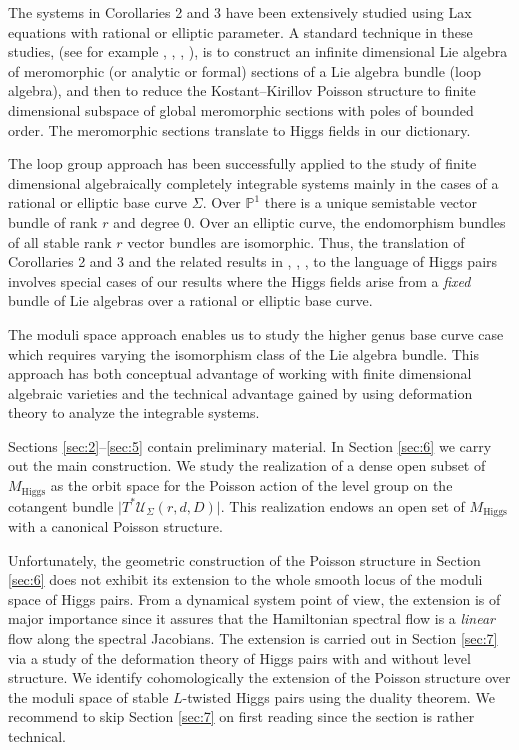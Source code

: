 \documentclass[12pt,a4paper,oneside,english]{smfart}
\theoremstyle{definition}
\theoremstyle{remark}
\newcommand{\Hig}{\mathrm{Higgs}}
\newcommand{\MH}{M_{\Hig}}
\newcommand{\cU}{\mathcal{U}}
\newcommand{\tot}[1]{\lvert #1 \rvert}
\begin{document}
The systems in Corollaries 2 and 3 have been extensively studied using Lax equations with rational or elliptic parameter. A standard technique in these studies, (see for example \cite{R-S}, \cite{A-vM}, \cite{A-H-H}, \cite{A-H-P}), is to construct an infinite dimensional Lie algebra of meromorphic (or analytic or formal) sections of a Lie algebra bundle (loop algebra), and then to reduce the Kostant--Kirillov Poisson structure to finite dimensional subspace of global meromorphic sections with poles of bounded order. The meromorphic sections translate to Higgs fields in our dictionary.

The loop group approach has been successfully applied to the study of finite dimensional algebraically completely integrable systems mainly in the cases of a rational or elliptic base curve $\Sigma$. Over $\mathbb{P}^1$ there is a unique semistable vector bundle of rank $r$ and degree $0$. Over an elliptic curve, the endomorphism bundles of all stable rank $r$ vector bundles are isomorphic. Thus, the translation of Corollaries 2 and 3 and the related results in \cite{R-S}, \cite{A-vM}, \cite{A-H-H}, \cite{A-H-P} to the language of Higgs pairs involves special cases of our results where the Higgs fields arise from a \emph{fixed} bundle of Lie algebras over a rational or elliptic base curve.

The moduli space approach enables us to study the higher genus base curve case which requires varying the isomorphism class of the Lie algebra bundle. This approach has both conceptual advantage of working with finite dimensional algebraic varieties and the technical advantage gained by using deformation theory to analyze the integrable systems.

Sections \ref{sec:2}--\ref{sec:5} contain preliminary material. In Section \ref{sec:6} we carry out the main construction. We study the realization of a dense open subset of $\MH$ as the orbit space for the Poisson action of the level group on the cotangent bundle $\tot{T^*\cU_{\Sigma}(r, d, D)}$. This realization endows an open set of $\MH$ with a canonical Poisson structure.

Unfortunately, the geometric construction of the Poisson structure in Section \ref{sec:6} does not exhibit its extension to the whole smooth locus of the moduli space of Higgs pairs. From a dynamical system point of view, the extension is of major importance since it assures that the Hamiltonian spectral flow is a \emph{linear} flow along the spectral Jacobians. The extension is carried out in Section \ref{sec:7} via a study of the deformation theory of Higgs pairs with and without level structure. We identify cohomologically the extension of the Poisson structure over the moduli space of stable $L$-twisted Higgs pairs using the duality theorem. We recommend to skip Section \ref{sec:7} on first reading since the section is rather technical.
\end{document}
